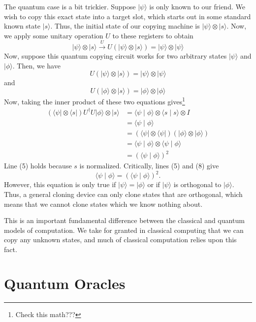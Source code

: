 \documentclass[12pt,twoside]{reedthesis}
\newcommand{\ket}[1]{\ensuremath{\lvert #1\rangle}\xspace}
\newcommand{\bra}[1]{\ensuremath{\langle #1\vert}\xspace}
\newcommand{\inner}[2]{\ensuremath{\langle #1 \mid #2 \rangle}\xspace}
\begin{document}
The quantum case is a bit trickier. Suppose \ket{\psi} is only known to our friend. We wish to copy this exact state into a target slot, which starts out in some standard known state \ket{s}. Thus, the initial state of our copying machine is $\ket{\psi} \otimes \ket{s}$. Now, we apply some unitary operation $U$ to these registers to obtain
\begin{equation}
\ket{\psi} \otimes \ket{s} \xrightarrow{U} U(\ket{\psi} \otimes \ket{s}) = \ket{\psi} \otimes \ket{\psi}
\end{equation}
Now, suppose this quantum copying circuit works for two arbitrary states \ket{\psi} and \ket{\phi}. Then, we have
\begin{equation}
U(\ket{\psi} \otimes \ket{s}) = \ket{\psi} \otimes \ket{\psi}
\end{equation}
and
\begin{equation}
U(\ket{\phi} \otimes \ket{s}) = \ket{\phi} \otimes \ket{\phi}
\end{equation}
Now, taking the inner product of these two equations gives\footnote{Check this math???} 
\begin{align}
(\bra{\psi} \otimes \bra{s})U^{\dagger}U \ket{\phi} \otimes \ket{s}
& = \inner{\psi}{\phi} \otimes \inner{s}{s} \otimes I \\
 & = \inner{\psi}{\phi}\\
& = (\bra{\psi}\otimes \bra{\psi})(\ket{\phi}\otimes \ket{\phi}) \\
& = \inner{\psi}{\phi} \otimes \inner{\psi}{\phi} \\
& = (\inner{\psi}{\phi})^2
\end{align}
Line (5) holds because $s$ is normalized. Critically, lines (5) and (8) give
\begin{equation*}
 \inner{\psi}{\phi} = (\inner{\psi}{\phi})^2.
\end{equation*}
However, this equation is only true if $\ket{\psi} = \ket{\phi}$ or if $\ket{\psi}$ is orthogonal to $\ket{\phi}$. Thus, a general cloning device can only clone states that are orthogonal, which means that we cannot clone states which we know nothing about. 

This is an important fundamental difference between the classical and quantum models of computation. We take for granted in classical computing that we can copy any unknown states, and much of classical computation relies upon this fact. 

\section{Quantum Oracles}
\end{document}
